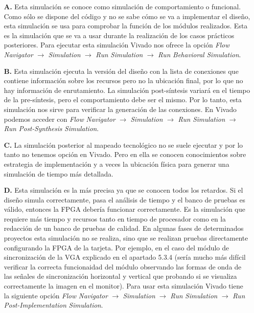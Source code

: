 \textbf{A.} Esta simulación se conoce como simulación de comportamiento o funcional. Como sólo se dispone 
del código y no se sabe cómo se va a implementar el diseño, esta simulación se usa para comprobar la 
función de los módulos realizados. Esta es la simulación que se va a usar durante la realización de los 
casos prácticos posteriores. Para ejecutar esta simulación Vivado nos ofrece la opción \textit{Flow Navigator} 
$\rightarrow$ \textit{Simulation} $\rightarrow$ \textit{Run Simulation} $\rightarrow$ \textit{Run 
Behavioral Simulation}.

\textbf{B.} Esta simulación ejecuta la versión del diseño con la lista de conexiones que contiene 
información sobre los recursos pero no la ubicación final, por lo que no hay información de enrutamiento. 
La simulación post-síntesis variará en el tiempo de la pre-síntesis, pero el comportamiento debe ser el 
mismo. Por lo tanto, esta simulación nos sirve para verificar la generación de las conexiones. En Vivado 
podemos acceder con \textit{Flow Navigator} $\rightarrow$ \textit{Simulation} $\rightarrow$ \textit{Run 
Simulation} $\rightarrow$ \textit{Run Post-Synthesis Simulation}.

\textbf{C.} La simulación posterior al mapeado tecnológico no se suele ejecutar y por lo tanto no tenemos opción en Vivado. 
Pero en ella se conocen conocimientos sobre estrategia de implementación y a veces la ubicación física para 
generar una simulación de tiempo más detallada.

\textbf{D.} Esta simulación es la más precisa ya que se conocen todos los retardos. Si el diseño simula 
correctamente, pasa el análisis de tiempo y el banco de pruebas es válido, entonces la FPGA debería funcionar 
correctamente. Es la simulación que requiere más tiempo y recursos tanto en tiempo de procesador como en la redacción 
de un banco de pruebas de calidad. En algunas fases de determinados proyectos esta simulación no se realiza, sino que se 
realizan pruebas directamente configurando la FPGA de la tarjeta. Por ejemplo, en el caso del módulo de sincronización 
de la VGA explicado en el apartado 5.3.4 (sería mucho más difícil verificar la correcta funcionaidad del módulo observando las formas de onda de las 
señales de sincronización horizontal y vertical que probando si se visualiza correctamente la imagen en el monitor). Para 
usar esta simulación Vivado tiene la siguiente opción \textit{Flow Navigator} $\rightarrow$ \textit{Simulation} $\rightarrow$ \textit{Run 
Simulation} $\rightarrow$ \textit{Run Post-Implementation Simulation}.

